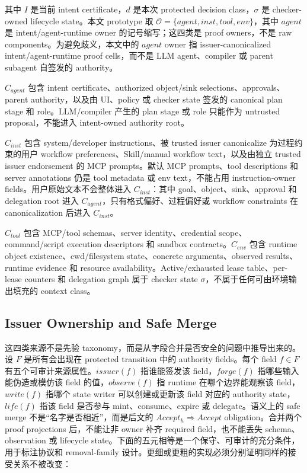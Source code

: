 \documentclass[UTF8,a4paper,11pt]{ctexart}
\begin{document}
其中 \(I\) 是当前 intent certificate，\(d\) 是本次 protected decision class，\(\sigma\) 是 checker-owned lifecycle state。本文 prototype 取 \(\mathcal{O}=\{agent,inst,tool,env\}\)，其中 \(agent\) 是 intent/agent-runtime owner 的记号缩写；这四类是 proof owners，不是 raw components。为避免歧义，本文中的 \(agent\) owner 指 issuer-canonicalized intent/agent-runtime proof cells，而不是 LLM agent、compiler 或 parent subagent 自签发的 authority。

\(C_{agent}\) 包含 intent certificate、authorized object/sink selections、approvals、parent authority，以及由 UI、policy 或 checker state 签发的 canonical plan stage 和 role。LLM/compiler 产生的 plan stage 或 role 只能作为 untrusted proposal，不能进入 intent-owned authority root。

\(C_{inst}\) 包含 system/developer instructions、被 trusted issuer canonicalize 为过程约束的用户 workflow preferences、Skill/manual workflow text，以及由独立 trusted issuer endorsement 的 MCP prompts。默认 MCP prompts、tool descriptions 和 server annotations 仍是 tool metadata 或 env text，不能占用 instruction-owner fields。用户原始文本不会整体进入 \(C_{inst}\)：其中 goal、object、sink、approval 和 delegation root 进入 \(C_{agent}\)，只有格式偏好、过程偏好或 workflow constraints 在 canonicalization 后进入 \(C_{inst}\)。

\(C_{tool}\) 包含 MCP/tool schemas、server identity、credential scope、command/script execution descriptors 和 sandbox contracts。\(C_{env}\) 包含 runtime object existence、cwd/filesystem state、concrete arguments、observed results、runtime evidence 和 resource availability。Active/exhausted lease table、per-lease counters 和 delegation graph 属于 checker state \(\sigma\)，不属于任何可由环境输出填充的 context class。

\subsection{Issuer Ownership and Safe Merge}

这四类来源不是先验 taxonomy，而是从字段合并是否安全的问题中推导出来的。设 \(F\) 是所有会出现在 protected transition 中的 authority fields。每个 field \(f\in F\) 有五个可审计来源属性。\(issuer(f)\) 指谁能签发该 field，\(forge(f)\) 指哪些输入能伪造或模仿该 field 的值，\(observe(f)\) 指 runtime 在哪个边界能观察该 field，\(write(f)\) 指哪个 state writer 可以创建或更新该 field 对应的 authority state，\(life(f)\) 指该 field 是否参与 mint、consume、expire 或 delegate。语义上的 safe merge 不是“名字是否相近”，而是后文的 \(Accept_h\Rightarrow Accept\) obligation。合并两个 proof projections 后，不能让非 owner 补齐 required field，也不能丢失 schema、observation 或 lifecycle state。下面的五元相等是一个保守、可审计的充分条件，用于标注协议和 removal-family 设计。更细或更粗的实现必须分别证明同样的接受关系不被改变：
\end{document}
